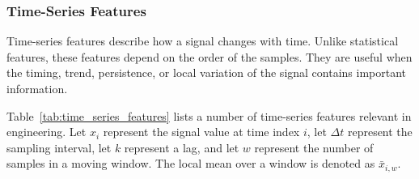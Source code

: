 \documentclass[12pt,letter]{article}
\begin{document}
\subsubsection{Time-Series Features}

Time-series features describe how a signal changes with time. Unlike statistical features, these features depend on the order of the samples. They are useful when the timing, trend, persistence, or local variation of the signal contains important information.

Table~\ref{tab:time_series_features} lists a number of time-series features relevant in engineering. Let \(x_i\) represent the signal value at time index \(i\), let \(\Delta t\) represent the sampling interval, let \(k\) represent a lag, and let \(w\) represent the number of samples in a moving window. The local mean over a window is denoted as \(\bar{x}_{i,w}\).
\end{document}
